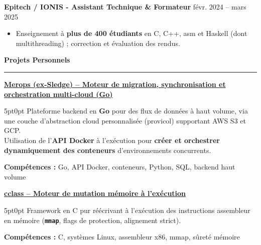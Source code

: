 \documentclass[9pt]{extarticle}
\begin{document}
\par\vspace{5pt}

{\bfseries Epitech / IONIS - Assistant Technique \& Formateur} \hfill févr. 2024 -- mars 2025
\begin{itemize}[noitemsep, topsep=0pt]
	\item Enseignement à {\bfseries plus de 400 étudiants} en C, C++, asm et Haskell (dont multithreading) ; correction et évaluation des rendus.
\end{itemize}

\par\vspace{5pt}

{\large\bfseries Projets Personnels}
\par\vspace{-8pt}
\rule{\linewidth}{0.4pt}
\par\vspace{5pt}

\underline{\bfseries Merops (ex-Sledge) -- Moteur de migration, synchronisation et orchestration multi-cloud (Go)}
\par
\begin{adjustwidth}{5pt}{0pt}
    Plateforme backend en {\bfseries Go} pour des flux de données à haut volume, via une couche d'abstraction cloud personnalisée ({\ttfamily provicol}) supportant AWS S3 et GCP. \\
    Utilisation de l'{\bfseries API Docker} à l'exécution pour {\bfseries créer et orchestrer dynamiquement des conteneurs} d'environnements concurrents.
\end{adjustwidth}
\par
{\bfseries Compétences :} Go, API Docker, conteneurs, Python, SQL, backend haut volume

\par\vspace{8pt}

\underline{\bfseries \href{https://github.com/paulogarithm/cclass}{cclass} -- Moteur de mutation mémoire à l'exécution}
\par
\begin{adjustwidth}{5pt}{0pt}
    Framework en C pur réécrivant à l'exécution des instructions assembleur en mémoire ({\bfseries \texttt{mmap}}, flags de protection, alignement strict).
\end{adjustwidth}
\par
{\bfseries Compétences :} C, systèmes Linux, assembleur x86, mmap, sûreté mémoire
\end{document}
